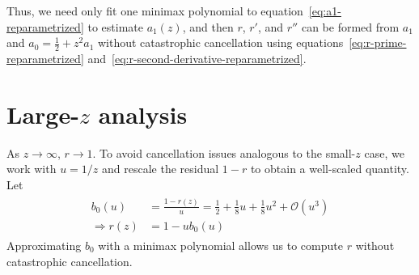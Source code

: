 \documentclass{article}
\begin{document}
Thus, we need only fit one minimax polynomial to equation~\eqref{eq:a1-reparametrized} to estimate $a_1(z)$, and then $r$, $r'$, and $r''$ can be formed from $a_1$ and $a_0 = \frac{1}{2} + z^2 a_1$ without catastrophic cancellation using equations~\eqref{eq:r-prime-reparametrized} and~\eqref{eq:r-second-derivative-reparametrized}.



\section{Large-$z$ analysis}

As $z \to \infty$, $r \to 1$.
To avoid cancellation issues analogous to the small-$z$ case, we work with $u=1/z$ and rescale the residual $1-r$ to obtain a well-scaled quantity.
Let
%
\begin{align}
  \boxed{
    \begin{aligned}
      b_0(u)           & = \frac{1-r(z)}{u} = \frac{1}{2} + \frac{1}{8} u + \frac{1}{8} u^2 + \mathcal{O}(u^3) \\
      \Rightarrow r(z) & = 1 - u b_0(u) \label{eq:r-large-reparametrized}
    \end{aligned}
  }
\end{align}
%
Approximating $b_0$ with a minimax polynomial allows us to compute $r$ without catastrophic cancellation.
\end{document}
